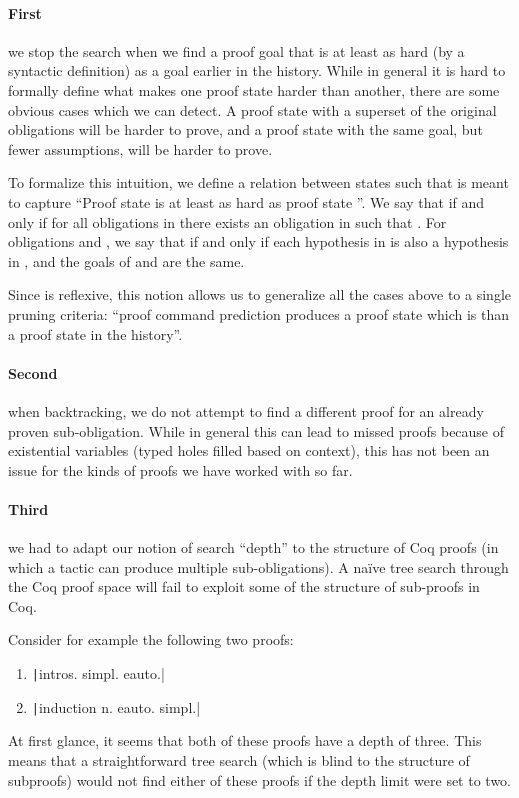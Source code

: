 \documentclass[sigplan,screen]{acmart}
\newcommand{\coqinline}[1]{\texttt|#1|}
\renewcommand{\>}{\quad}
\begin{document}
\paragraph{First} we stop the search when we find a proof goal
that is at least as hard (by a syntactic definition)
as a goal earlier in the history.
While in general it is hard to formally define
  what makes one proof state harder than another,
  there are some obvious cases which we can detect.
A proof state with a superset of the original obligations will be harder to prove,
and a proof state with the same goal, but fewer assumptions, will be harder to prove.

To formalize this intuition, we define a relation  between states
  such that  is meant to capture
  ``Proof state  is at least as hard as proof state ''.
We say that  if and only if for all obligations  in 
  there exists an obligation  in  such that
  .
For obligations  and , we say that
   if and only if each hypothesis in 
  is also a hypothesis in ,
  and the goals of  and  are the same.

Since  is reflexive,
  this notion allows us to generalize all the cases above
  to a single pruning criteria:
  ``proof command prediction produces a proof state
    which is  than a proof state in the history''.

\paragraph{Second} when backtracking, we do not attempt to find a
different proof for an already proven sub-obligation. While in general this can
lead to missed proofs because of existential variables (typed holes filled based on context),
this has not been an issue for the kinds of proofs we have worked with so far.

\paragraph{Third} we had to adapt our notion of search ``depth'' to the
structure of Coq proofs (in which a tactic can produce multiple
sub-obligations).
A na\"ive tree search through the Coq proof space will fail to exploit some of the structure of sub-proofs in Coq.

Consider for example the following two proofs:
\begin{enumerate}
\item \coqinline{intros. simpl. eauto.}
\item \coqinline{induction n. eauto. simpl.}
\end{enumerate}
At first glance, it seems that both of these proofs have a depth of three.
This means that a straightforward tree search (which is blind to the structure of subproofs) would not find either of these proofs if the depth limit were set to two.
\end{document}
